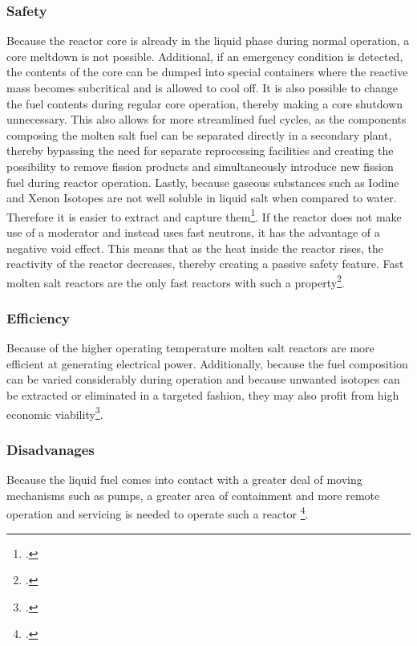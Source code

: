 \subsubsection{Safety}
Because the reactor core is already in the liquid phase during normal operation, a core meltdown is not
possible. Additional, if an emergency condition is detected, the contents of the core can be dumped
into special containers where the reactive mass becomes subcritical and is allowed to cool off.
It is also possible to change the fuel contents during regular core operation, thereby making a core
shutdown unnecessary. This also allows for more streamlined fuel cycles, as the components composing
the molten salt fuel can be separated directly in a secondary plant, thereby bypassing the need for
separate reprocessing facilities and creating the possibility to remove fission products and simultaneously
introduce new fission fuel during reactor operation. Lastly, because gaseous substances such as Iodine
and Xenon Isotopes are not well soluble in liquid salt when compared to water. Therefore
it is easier to extract and capture them\footcite{msrs}. If the reactor does not make use
of a moderator and instead uses fast neutrons, it has the advantage of a negative void effect. This
means that as the heat inside the reactor rises, the reactivity of the reactor decreases, thereby
creating a passive safety feature. Fast molten salt reactors are the only fast reactors with such a
property\footcite[164]{T4Gen}.
\subsubsection{Efficiency}
Because of the higher operating temperature molten salt reactors are more efficient at generating
electrical power. Additionally, because the fuel composition can be varied considerably during operation
and because unwanted isotopes can be extracted or eliminated in a targeted fashion, they may also
profit from high economic viability\footcite[159-161]{IVHandbook}.
\subsubsection{Disadvanages}
Because the liquid fuel comes into contact with a greater deal of moving mechanisms such as pumps, a
greater area of containment and more remote operation and servicing is needed to operate such a reactor
\footcite{msrs}.
